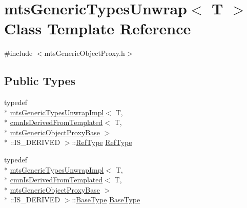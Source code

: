 \hypertarget{classmts_generic_types_unwrap}{\section{mts\-Generic\-Types\-Unwrap$<$ T $>$ Class Template Reference}
\label{classmts_generic_types_unwrap}
}


{\ttfamily \#include $<$mts\-Generic\-Object\-Proxy.\-h$>$}

\subsection*{Public Types}
\begin{DoxyCompactItemize}
\item 
typedef \\*
\hyperlink{classmts_generic_types_unwrap_impl}{mts\-Generic\-Types\-Unwrap\-Impl}$<$ T, \\*
\hyperlink{classcmn_is_derived_from_templated}{cmn\-Is\-Derived\-From\-Templated}$<$ T, \\*
\hyperlink{classmts_generic_object_proxy_base}{mts\-Generic\-Object\-Proxy\-Base} $>$\\*
\-::I\-S\-\_\-\-D\-E\-R\-I\-V\-E\-D $>$\-::\hyperlink{classmts_generic_types_unwrap_a24e5f78383cd6567646fcdc413d02420}{Ref\-Type} \hyperlink{classmts_generic_types_unwrap_a24e5f78383cd6567646fcdc413d02420}{Ref\-Type}
\item 
typedef \\*
\hyperlink{classmts_generic_types_unwrap_impl}{mts\-Generic\-Types\-Unwrap\-Impl}$<$ T, \\*
\hyperlink{classcmn_is_derived_from_templated}{cmn\-Is\-Derived\-From\-Templated}$<$ T, \\*
\hyperlink{classmts_generic_object_proxy_base}{mts\-Generic\-Object\-Proxy\-Base} $>$\\*
\-::I\-S\-\_\-\-D\-E\-R\-I\-V\-E\-D $>$\-::\hyperlink{classmts_generic_types_unwrap_a380693b0f12de3c3610bbb252b6fe082}{Base\-Type} \hyperlink{classmts_generic_types_unwrap_a380693b0f12de3c3610bbb252b6fe082}{Base\-Type}
\end{DoxyCompactItemize}


